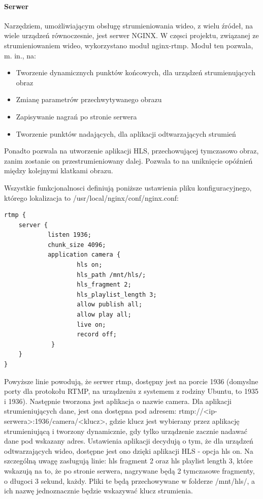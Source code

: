 \paragraph{Serwer}
Narzędziem, umożliwiającym obsługę strumieniowania wideo, z wielu źródeł, na wiele urządzeń równoczesnie, jest serwer NGINX. W częsci projektu, związanej ze strumieniowaniem wideo, wykorzystano moduł nginx-rtmp. 
Moduł ten pozwala, m. in., na:
\begin{itemize}
\item Tworzenie dynamicznych punktów końcowych, dla urządzeń strumienujących obraz
\item Zmianę parametrów przechwytywanego obrazu 
\item Zapisywanie nagrań po stronie serwera
\item Tworzenie punktów nadających, dla aplikacji odtwarzających strumień
\end{itemize}
Ponadto pozwala na utworzenie aplikacji HLS, przechowującej tymczasowo obraz, zanim zostanie on przestrumieniowany dalej. Pozwala to na uniknięcie opóźnień między kolejnymi klatkami obrazu.

Wszystkie funkcjonalnosci definiują poniższe ustawienia pliku konfiguracyjnego, którego lokalizacja to /usr/local/nginx/conf/nginx.conf:

\begin{verbatim}
rtmp {
    server {
            listen 1936;
            chunk_size 4096;
            application camera {
                    hls on;
                    hls_path /mnt/hls/;
                    hls_fragment 2;
                    hls_playlist_length 3;
                    allow publish all;
                    allow play all;
                    live on;
                    record off;
             }
    }
}
\end{verbatim}

Powyższe linie powodują, że serwer rtmp, dostępny jest na porcie 1936 (domyslne porty dla protokołu RTMP, na urządzeniu z systemem z rodziny Ubuntu,  to 1935 i 1936). Następnie tworzona jest aplikacja o nazwie camera. Dla aplikacji strumieniujących dane, jest ona dostępna pod adresem: rtmp://<ip-serwera>:1936/camera/<klucz>, gdzie klucz jest wybierany przez aplikację strumieniującą i tworzony dynamicznie, gdy tylko urządzenie zacznie nadawać dane pod wskazany adres.
Ustawienia aplikacji decydują o tym, że dla urządzeń odtwarzających wideo, dostępne jest ono dzięki aplikacji HLS - opcja hls on. Na szczególną uwagę zasługują linie: hls fragment 2 oraz hls playlist length 3, które wskazują na to, że po stronie serwera, nagrywane będą 2 tymczasowe fragmenty, o długoci 3 sekund, każdy. Pliki te będą przechowywane w folderze /mnt/hls/, a ich nazwę jednoznacznie będzie wskazywać klucz strumienia.

